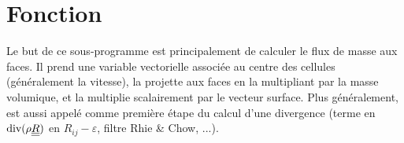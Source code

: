 %
% 
%
% 
% 
% 
%
%


\vspace{1cm}
\section{Fonction}
Le but de ce sous-programme est principalement de calculer le flux de masse aux
faces. Il prend une variable vectorielle associ\'ee au centre des cellules
(g\'en\'eralement la vitesse), la projette aux faces en la multipliant par la
masse volumique, et la multiplie scalairement par le vecteur surface.
Plus g\'en\'eralement,  est aussi appel\'e comme premi\`ere \'etape 
du calcul d'une divergence (terme en $\text{div}(\rho\underline{\underline{R}})$ en
$R_{ij}-\varepsilon$, filtre Rhie \& Chow, ...).


